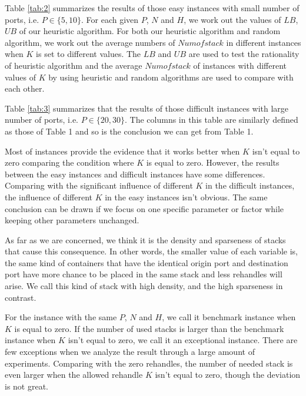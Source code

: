 \documentclass[review,3p,times,authoryear,12pt]{elsarticle}
\begin{document}
Table \ref{tab:2} summarizes the results of those easy instances with small number of ports, i.e. $P \in \{5, 10\}$.
For each given $P$, $N$ and $H$, we work out the values of $LB$, $UB$ of our heuristic algorithm.
For both our heuristic algorithm and random algorithm, we work out the average numbers of $Numofstack$ in different instances when $K$ is set to different values.
The $LB$ and $UB$ are used to test the rationality of heuristic algorithm and the average $Numofstack$ of instances with different values of $K$ by using heuristic and random algorithms are used to compare with each other.

Table \ref{tab:3} summarizes that the results of those difficult instances with large number of ports, i.e. $P \in \{20, 30\}$.
The columns in this table are similarly defined as those of Table 1 and so is the conclusion we can get from Table 1.

Most of instances provide the evidence that it works better when $K$ isn't equal to zero comparing the condition where $K$ is equal to zero.
However, the results between the easy instances and difficult instances have some differences.
Comparing with the significant influence of different $K$ in the difficult instances, the influence of different $K$ in the easy instances isn't obvious.
The same conclusion can be drawn if we focus on one specific parameter or factor while keeping other parameters unchanged.

As far as we are concerned, we think it is the density and sparseness of stacks that cause this consequence.
In other words, the smaller value of each variable is, the same kind of containers that have the identical origin port and destination port have more chance to be placed in the same stack and less rehandles will arise.
We call this kind of stack with high density, and the high sparseness in contrast.

For the instance with the same $P$, $N$ and $H$, we call it benchmark instance when $K$ is equal to zero.
If the number of used stacks is larger than the benchmark instance when $K$ isn't equal to zero, we call it an exceptional instance.
There are few exceptions when we analyze the result through a large amount of experiments.
Comparing with the zero rehandles, the number of needed stack is even larger when the allowed rehandle $K$ isn't equal to zero, though the deviation is not great.
\end{document}
